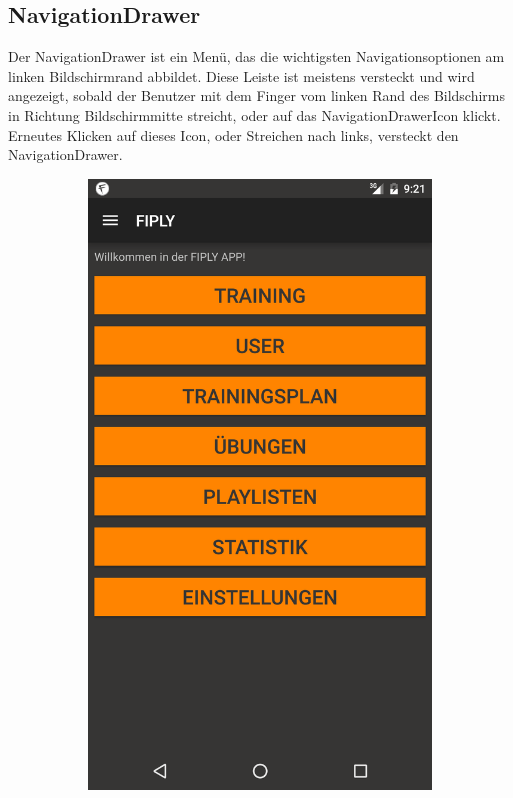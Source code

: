 \documentclass[FIPLY_base.tex]{subfiles}
\begin{document}
\subsection{NavigationDrawer}
Der NavigationDrawer ist ein Menü, das die wichtigsten Navigationsoptionen am linken Bildschirmrand abbildet.
Diese Leiste ist meistens versteckt und wird angezeigt, sobald der Benutzer mit dem Finger vom linken Rand des Bildschirms in Richtung Bildschirmmitte streicht, oder auf das NavigationDrawerIcon klickt.
Erneutes Klicken auf dieses Icon, oder Streichen nach links, versteckt den NavigationDrawer. 
\ \\
\begin{figure}[h]
	\begin{subfigure}[b]{0.3\textwidth}
	\includegraphics[scale=0.15]{img/NavDrawerClosed}

\end{subfigure}
\end{figure}
\end{document}
